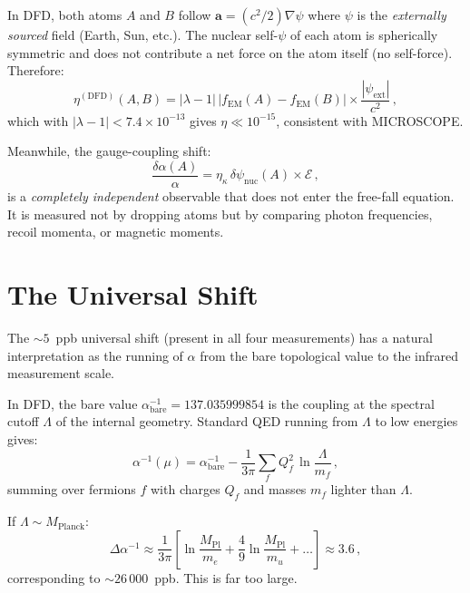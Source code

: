 \documentclass[aps,prd,twocolumn,superscriptaddress,nofootinbib]{revtex4-2}
\newcommand{\avec}{\mathbf{a}}
\newcommand{\ee}[1]{\times 10^{#1}}
\newcommand{\kap}{\kappa}
\newcommand{\lam}{\lambda}
\newcommand{\fEM}{f_{\mathrm{EM}}}
\newcommand{\ainv}{\alpha^{-1}}
\newcommand{\dpsi}{\delta\psi}
\begin{document}
In DFD, both atoms $A$ and $B$ follow $\avec = (c^2/2)\nabla\psi$
where $\psi$ is the \emph{externally sourced} field (Earth, Sun, etc.).
The nuclear self-$\psi$ of each atom is spherically symmetric and
does not contribute a net force on the atom itself (no self-force).
Therefore:
\begin{equation}
\eta^{(\mathrm{DFD})}(A,B) = |\lam - 1|\,|\fEM(A) - \fEM(B)|
\times \frac{|\psi_{\mathrm{ext}}|}{c^2}\,,
\end{equation}
which with $|\lam - 1| < 7.4\ee{-13}$ gives $\eta \ll 10^{-15}$,
consistent with MICROSCOPE\@.

Meanwhile, the gauge-coupling shift:
\begin{equation}
\frac{\delta\alpha(A)}{\alpha} = \eta_\kap\,\dpsi_{\mathrm{nuc}}(A)
\times \mathcal{E}\,,
\end{equation}
is a \emph{completely independent} observable that does not enter the
free-fall equation.  It is measured not by dropping atoms but by
comparing photon frequencies, recoil momenta, or magnetic moments.


\section{The Universal Shift}
\label{sec:universal}

The $\sim\!5$~ppb universal shift (present in all four measurements)
has a natural interpretation as the running of $\alpha$ from the
bare topological value to the infrared measurement scale.

In DFD, the bare value $\ainv_{\mathrm{bare}} = 137.035999854$ is
the coupling at the spectral cutoff $\Lambda$ of the internal
geometry.  Standard QED running from $\Lambda$ to low energies gives:
\begin{equation}
\ainv(\mu) = \ainv_{\mathrm{bare}} - \frac{1}{3\pi}
\sum_f Q_f^2\,\ln\frac{\Lambda}{m_f}\,,
\end{equation}
summing over fermions $f$ with charges $Q_f$ and masses $m_f$
lighter than $\Lambda$.

If $\Lambda \sim M_{\mathrm{Planck}}$:
\begin{equation}
\Delta\ainv \approx \frac{1}{3\pi}\left[
\ln\frac{M_{\mathrm{Pl}}}{m_e}
+ \frac{4}{9}\ln\frac{M_{\mathrm{Pl}}}{m_u}
+ \ldots\right]
\approx 3.6\,,
\end{equation}
corresponding to $\sim\!26\,000$~ppb.  This is far too large.
\end{document}
